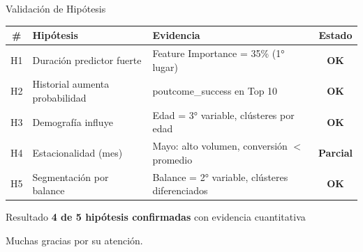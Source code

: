\documentclass[10pt]{beamer}
\begin{document}
\begin{frame}{Validación de Hipótesis}
    \begin{table}[h]
        \centering
        \tiny
        \begin{tabular}{clp{5cm}c}
            \toprule
            \textbf{\#} & \textbf{Hipótesis} & \textbf{Evidencia} & \textbf{Estado} \\
            \midrule
            H1 & Duración predictor fuerte & Feature Importance = 35\% (1° lugar) & \textcolor{mGreen}{\textbf{OK}} \\
            \midrule
            H2 & Historial aumenta probabilidad & poutcome\_success en Top 10 & \textcolor{mGreen}{\textbf{OK}} \\
            \midrule
            H3 & Demografía influye & Edad = 3° variable, clústeres por edad & \textcolor{mGreen}{\textbf{OK}} \\
            \midrule
            H4 & Estacionalidad (mes) & Mayo: alto volumen, conversión $<$ promedio & \textcolor{mOrange}{\textbf{Parcial}} \\
            \midrule
            H5 & Segmentación por balance & Balance = 2° variable, clústeres diferenciados & \textcolor{mGreen}{\textbf{OK}} \\
            \bottomrule
        \end{tabular}
    \end{table}
    
    \vspace{0.3cm}
    \begin{block}{Resultado}
        \textbf{4 de 5 hipótesis confirmadas} con evidencia cuantitativa
    \end{block}
    Muchas gracias por su atención.
\end{frame}
\end{document}
